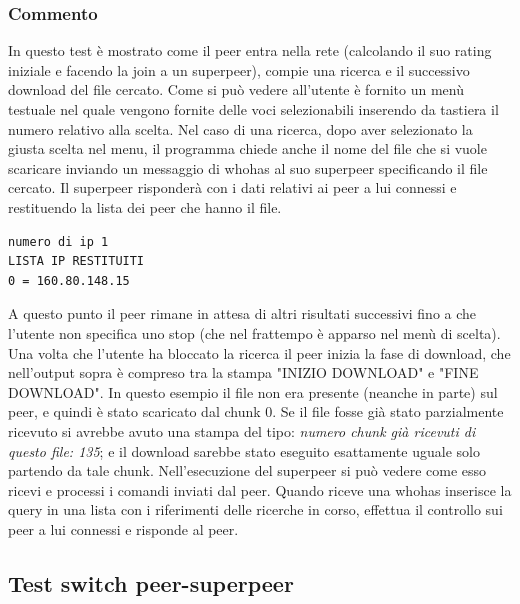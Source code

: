 \subsubsection{Commento}
In questo test è mostrato come il peer entra nella rete (calcolando il suo rating iniziale e facendo la join a un superpeer), compie una ricerca e il successivo download del file cercato.\linebreak
Come si può vedere all'utente è fornito un menù testuale nel quale vengono fornite delle voci selezionabili inserendo da tastiera il numero relativo alla scelta.\linebreak
Nel caso di una ricerca, dopo aver selezionato la giusta scelta nel menu, il programma chiede anche il nome del file che si vuole scaricare inviando un messaggio di whohas al suo superpeer specificando il file cercato.\linebreak 
Il superpeer risponderà con i dati relativi ai peer a lui connessi e restituendo la lista dei peer che hanno il file.\linebreak
\begin{verbatim}
numero di ip 1
LISTA IP RESTITUITI
0 = 160.80.148.15
\end{verbatim}
A questo punto il peer rimane in attesa di altri risultati successivi fino a che l'utente non specifica uno stop (che nel frattempo è apparso nel menù di scelta). Una volta che l'utente ha bloccato la ricerca il peer inizia la fase di download, che nell'output sopra è compreso tra la stampa "INIZIO DOWNLOAD" e "FINE DOWNLOAD".\linebreak
In questo esempio il file non era presente (neanche in parte) sul peer, e quindi è stato scaricato dal chunk 0. Se il file fosse già stato parzialmente ricevuto si avrebbe avuto una stampa del tipo: \textit{numero chunk già ricevuti di questo file: 135}; e il download sarebbe stato eseguito esattamente uguale solo partendo da tale chunk.\linebreak
Nell'esecuzione del superpeer si può vedere come esso ricevi e processi i comandi inviati dal peer. Quando riceve una whohas inserisce la query in una lista con i riferimenti delle ricerche in corso, effettua il controllo sui peer a lui connessi e risponde al peer.

\subsection{Test switch peer-superpeer}
